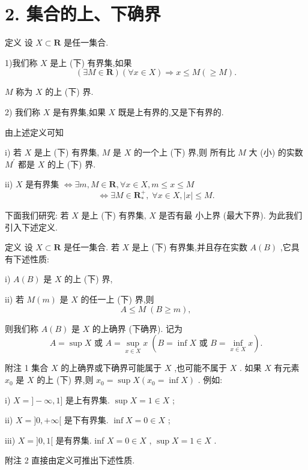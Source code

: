 \section*{2. 集合的上、下确界}

定义 设 $X \subset  \mathbf{R}$ 是任一集合.

1)我们称 $X$ 是上 (下) 有界集,如果
$$\left( {\exists M \in  \mathbf{R}}\right) \left( {\forall x \in  X}\right)  \Rightarrow  x \leq  M\left( { \geq  M}\right) .$$

$M$ 称为 $X$ 的上 (下) 界.

2) 我们称 $X$ 是有界集,如果 $X$ 既是上有界的,又是下有界的.

由上述定义可知

i) 若 $X$ 是上 (下) 有界集, $M$ 是 $X$ 的一个上 (下) 界,则 所有比 $M$ 大 (小) 的实数 ${M}^{\prime }$ 都是 $X$ 的上 (下) 界.

ii) $X$ 是有界集 $\Leftrightarrow  \exists m,M \in  \mathbf{R},\forall x \in  X,m \leq  x \leq  M$
$$\Leftrightarrow  \exists M \in  {\mathbf{R}}_{ * }^{ + },\;\forall x \in  X,\left| x\right|  \leq  M.$$

下面我们研究: 若 $X$ 是上 (下) 有界集, $X$ 是否有最 小上界 (最大下界). 为此我们引入下述定义.

定义 设 $X \subset  \mathbf{R}$ 是任一集合. 若 $X$ 是上 (下) 有界集,并且存在实数 $A\left( B\right)$ ,它具有下述性质:

i) $A\left( B\right)$ 是 $X$ 的上 (下) 界,

ii) 若 $M\left( m\right)$ 是 $X$ 的任一上 (下) 界,则
$$A \leq  M\;\left( {B \geq  m}\right) ,$$

则我们称 $A\left( B\right)$ 是 $X$ 的上确界 (下确界). 记为
$$A = \sup X\text{ 或 }A = \mathop{\sup }\limits_{{x \in  X}}x\;\left( {B = \inf X\text{ 或 }B = \mathop{\inf }\limits_{{x \in  X}}x}\right) .$$

附注 1 集合 $X$ 的上确界或下确界可能属于 $X$ ,也可能不属于 $X$ . 如果 $X$ 有元素 ${x}_{0}$ 是 $X$ 的上 (下) 界,则 ${x}_{0} = \sup X\left( {{x}_{0} = \inf X}\right)$ . 例如:

i) $X = \rbrack  - \infty ,1\rbrack$ 是上有界集. $\sup X = 1 \in  X$ ;

ii) $X = \rbrack 0, + \infty \lbrack$ 是下有界集. $\inf X = 0 \in  X$ ;

iii) $X = \rbrack 0,1\lbrack$ 是有界集. inf $X = 0 \in  X$ , $\sup X = 1 \in  X$ .

附注 2 直接由定义可推出下述性质.

